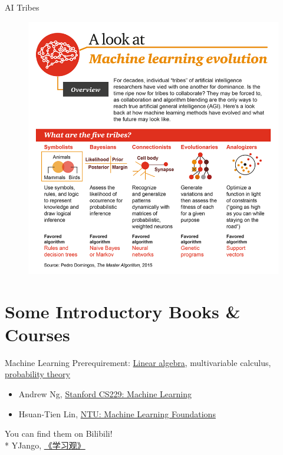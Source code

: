 \documentclass{../TexTemplate/myslide}
\begin{document}
\begin{frame}{AI Tribes}
\begin{figure}
\centering
\includegraphics[width=0.6\linewidth]{fig/A-Look-at-Machine-Learning-Evolution.png}
\end{figure}
\end{frame}

\section{Some Introductory Books \& Courses}
\begin{frame}
\sectionpage
\end{frame}

\begin{frame}{Machine Learning}
Prerequirement: \href{http://cs229.stanford.edu/section/cs229-linalg.pdf}{Linear algebra}, multivariable calculus, \href{http://cs229.stanford.edu/section/cs229-prob.pdf}{probability theory}
\begin{itemize}
	\item Andrew Ng, \href{http://cs229.stanford.edu/}{Stanford CS229: Machine Learning}
	\item Hsuan-Tien Lin, \href{https://www.csie.ntu.edu.tw/~htlin/course/mlfound19fall/}{NTU: Machine Learning Foundations}
\end{itemize}
You can find them on Bilibili!\\\bigskip
* YJango, \href{https://space.bilibili.com/344849038/channel/detail?cid=54015}{《学习观》}
\end{frame}
\end{document}
